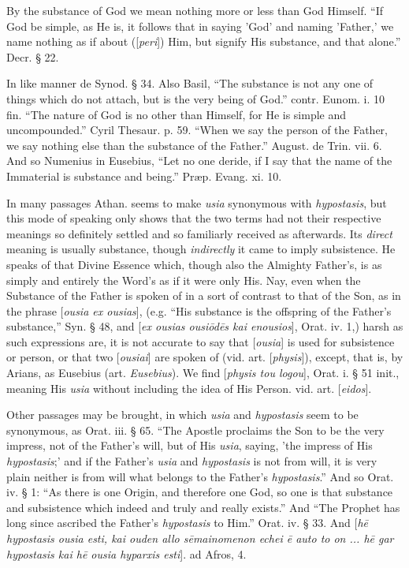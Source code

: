 By the substance of God we mean nothing more or
less than God Himself. ``If God be simple, as He is, it follows that in
saying 'God' and naming 'Father,' we name nothing as if about ([\emph{peri}])
Him, but signify His substance, and that alone.'' Decr. § 22.

In like manner de Synod. § 34. Also Basil, ``The
substance is not any one of things which do not attach, but is the
very being of God.'' contr. Eunom. i. 10 fin. ``The nature of God is no
other than Himself, for He is simple and uncompounded.'' Cyril Thesaur.
p. 59. ``When we say the person of the Father, we say nothing else than
the substance of the Father.'' August. de Trin. vii. 6. And so Numenius
in Eusebius, ``Let no one deride, if I say that the name of the
Immaterial is substance and being.'' Præp. Evang. xi. 10.

In many passages Athan. seems to make \emph{usia}
synonymous with \emph{hypostasis}, but this mode of speaking only
shows that the two terms had not their respective meanings so
definitely settled and so familiarly received as afterwards. Its \emph{direct}
meaning is usually substance, though \emph{indirectly} it came to
imply subsistence. He speaks of that Divine Essence which,
though also the Almighty Father's, is as simply and entirely the Word's
as if it were only His. Nay, even when the Substance of the Father is
spoken of in a sort of contrast to that of the Son, as in the phrase [\emph{ousia
ex ousias}], (e.g. ``His substance is the offspring of the Father's
substance,'' Syn. § 48, and [\emph{ex ousias ousi\={o}d\={e}s kai
enousios}], Orat. iv. 1,) harsh as such expressions are, it is not
accurate to say that [\emph{ousia}] is used for subsistence or person,
or that two [\emph{ousiai}] are spoken of (vid. art. [\emph{physis}]),
except, that is, by Arians, as Eusebius (art. \emph{Eusebius}). We
find [\emph{physis tou logou}], Orat. i. § 51 init., meaning His \emph{usia}
without including the idea of His Person. vid. art. [\emph{eidos}].

Other passages may be brought, in which \emph{usia}
and \emph{hypostasis} seem to be synonymous, as Orat. iii. § 65. ``The
Apostle proclaims the Son to be the very impress, not of the Father's
will, but of His \emph{usia}, saying, 'the impress of His \emph{hypostasis};'
and if the Father's \emph{usia} and \emph{hypostasis} is not from
will, it is very plain neither is from will what belongs to the Father's
\emph{hypostasis}.'' And so Orat. iv. § 1: ``As there is one Origin,
and therefore one God, so one is that substance and subsistence which
indeed and truly and really exists.'' And ``The Prophet has long since
ascribed the Father's \emph{hypostasis} to Him.'' Orat. iv. § 33.
And [\emph{h\={e} hypostasis ousia esti, kai ouden allo s\={e}mainomenon
echei \={e} auto to on ... h\={e} gar hypostasis kai h\={e}
ousia hyparxis esti}]. ad Afros, 4.

